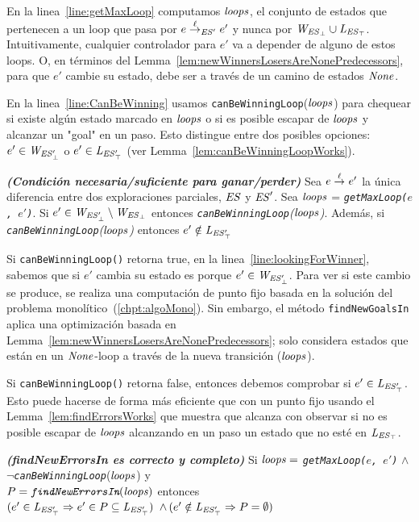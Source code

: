 En la linea~\ref{line:getMaxLoop} computamos $\mathit{loops}$, el conjunto de estados que pertenecen a un loop que pasa por $e \overset{\ell}{\rightarrow}_{\mathit{ES}'} e'$ y nunca por $\mathit{W_{\mathit{\mathit{ES}_{\bot}}}} \cup \mathit{L_{\mathit{\mathit{ES}_{\top}}}}$. 
Intuitivamente, cualquier controlador para $e'$ va a depender de alguno de estos loops. O, en términos del Lemma~\ref{lem:newWinnersLosersAreNonePredecessors}, para que $e'$ cambie su estado, debe ser a través de un camino de estados $\mathit{None}$. 

En la linea~\ref{line:CanBeWinning} usamos \texttt{canBeWinningLoop}($\mathit{loops}$) para chequear si existe algún estado marcado en $\mathit{loops}$ o si es posible escapar de $\mathit{loops}$ y alcanzar un "goal" en un paso. Esto distingue entre dos posibles opciones: $e' \in \mathit{W_{\mathit{\mathit{ES}'_{\bot}}}}$ o $e' \in \mathit{L_{\mathit{\mathit{ES}'_{\top}}}}$ (ver 
Lemma~\ref{lem:canBeWinningLoopWorks}). 

\begin{lemma}\textbf{\emph{(Condición necesaria/suficiente para ganar/perder)}}
\label{lem:canBeWinningLoopWorks}
Sea $e \overset{\ell}{\rightarrow}_{} e'$ la única diferencia entre dos exploraciones parciales, 
$\mathit{ES}$ y $\mathit{ES}'$. Sea $\mathit{loops}$ = \emph{\texttt{getMaxLoop($e$, 
$e'$)}}.
Si $e' \in \mathit{W_{\mathit{\mathit{ES}'_{\bot}}}} \setminus \mathit{W_{\mathit{\mathit{ES}_{\bot}}}}$ 
entonces \emph{\texttt{canBeWinningLoop}($\mathit{loops}$)}. Además, si \\ 
\emph{\texttt{canBeWinningLoop}($\mathit{loops}$)} entonces $e' \notin \mathit{L_{\mathit{\mathit{ES}'_{\top}}}}$ 
\end{lemma}


Si \texttt{canBeWinningLoop()} retorna true, en la  linea~\ref{line:lookingForWinner}, 
sabemos que si $e'$ cambia su estado es porque $e' \in \mathit{W_{\mathit{\mathit{ES}'_{\bot}}}}$. Para ver si este cambio se produce, se realiza una computación de punto fijo basada en la solución del problema monolítico~(\ref{chpt:algoMono}). 
Sin embargo, el método \texttt{findNewGoalsIn} aplica una optimización basada en Lemma~\ref{lem:newWinnersLosersAreNonePredecessors}; solo considera estados que están en un $\mathit{None}$-loop a través de la nueva transición ($\mathit{loops}$).

Si \texttt{canBeWinningLoop()} retorna false, entonces debemos comprobar si $e' \in \mathit{L_{\mathit{\mathit{ES}'_{\top}}}}$.
Esto puede hacerse de forma más eficiente que con un punto fijo usando el Lemma~\ref{lem:findErrorsWorks} que muestra que alcanza con observar si no es posible escapar de $\mathit{loops}$ alcanzando en un paso un estado que no esté en $\mathit{L_{\mathit{\mathit{ES}_{\top}}}}$. 



\begin{lemma}\textbf{\emph{(findNewErrorsIn es correcto y completo)}}
\label{lem:findErrorsWorks}
Si $\mathit{loops} =$ \emph{\texttt{getMaxLoop($e$, $e'$)}} $\wedge$\\ 
$\neg$\emph{\texttt{canBeWinningLoop}}($\mathit{loops}$) y \\
$P=\emph{\texttt{findNewErrorsIn}}(\mathit{loops})$ entonces \\
$(e' \in \mathit{L_{\mathit{\mathit{ES}'_{\top}}}} \Rightarrow e' \in P 
\subseteq \mathit{L_{\mathit{\mathit{ES}'_{\top}}}})$ $\wedge \, (e' \notin \mathit{L_{\mathit{\mathit{ES}'_{\top}}}} \Rightarrow P = 
\emptyset)$
\end{lemma}



